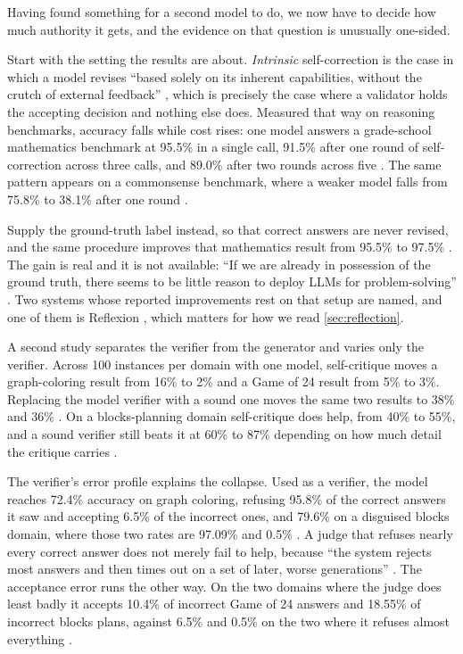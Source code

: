 Having found something for a second model to do, we now have to decide how much authority it gets,
and the evidence on that question is unusually one-sided.

Start with the setting the results are about. \emph{Intrinsic} self-correction is the case in which
a model revises ``based solely on its inherent capabilities, without the crutch of external
feedback'' \citep[\S1]{huang2024selfcorrect}, which is precisely the case where a validator holds
the accepting decision and nothing else does. Measured that way on reasoning benchmarks, accuracy
falls while cost rises: one model answers a grade-school mathematics benchmark at 95.5\% in a single
call, 91.5\% after one round of self-correction across three calls, and 89.0\% after two rounds
across five \citep[Table~3]{huang2024selfcorrect}. The same pattern appears on a commonsense
benchmark, where a weaker model falls from 75.8\% to 38.1\% after one round
\citep[Table~3]{huang2024selfcorrect}.

Supply the ground-truth label instead, so that correct answers are never revised, and the same
procedure improves that mathematics result from 95.5\% to 97.5\%
\citep[Table~2]{huang2024selfcorrect}. The gain is real and it is not available: ``If we are already
in possession of the ground truth, there seems to be little reason to deploy LLMs for
problem-solving'' \citep[\S3]{huang2024selfcorrect}. Two systems whose reported improvements rest on
that setup are named, and one of them is Reflexion \citep[Table~1]{huang2024selfcorrect}, which
matters for how we read \cref{sec:reflection}.

A second study separates the verifier from the generator and varies only the verifier. Across 100
instances per domain with one model, self-critique moves a graph-coloring result from 16\% to 2\%
and a Game of 24 result from 5\% to 3\%. Replacing the model verifier with a sound one moves the
same two results to 38\% and 36\% \citep[Table~1]{stechly2025selfverification}. On a
blocks-planning domain self-critique does help, from 40\% to 55\%, and a sound verifier still beats
it at 60\% to 87\% depending on how much detail the critique carries
\citep[Table~1]{stechly2025selfverification}.

The verifier's error profile explains the collapse. Used as a verifier, the model reaches 72.4\%
accuracy on graph coloring, refusing 95.8\% of the correct answers it saw and accepting 6.5\% of the
incorrect ones, and 79.6\% on a disguised blocks domain, where those two rates are 97.09\% and 0.5\%
\citep[Table~2]{stechly2025selfverification}. A judge
that refuses nearly every correct answer does not merely fail to help, because ``the system rejects
most answers and then times out on a set of later, worse generations''
\citep[\S5]{stechly2025selfverification}. The acceptance error runs the other way. On the two
domains where the judge does least badly it accepts 10.4\% of incorrect Game of 24 answers and
18.55\% of incorrect blocks plans, against 6.5\% and 0.5\% on the two where it refuses almost
everything \citep[Table~2]{stechly2025selfverification}.

